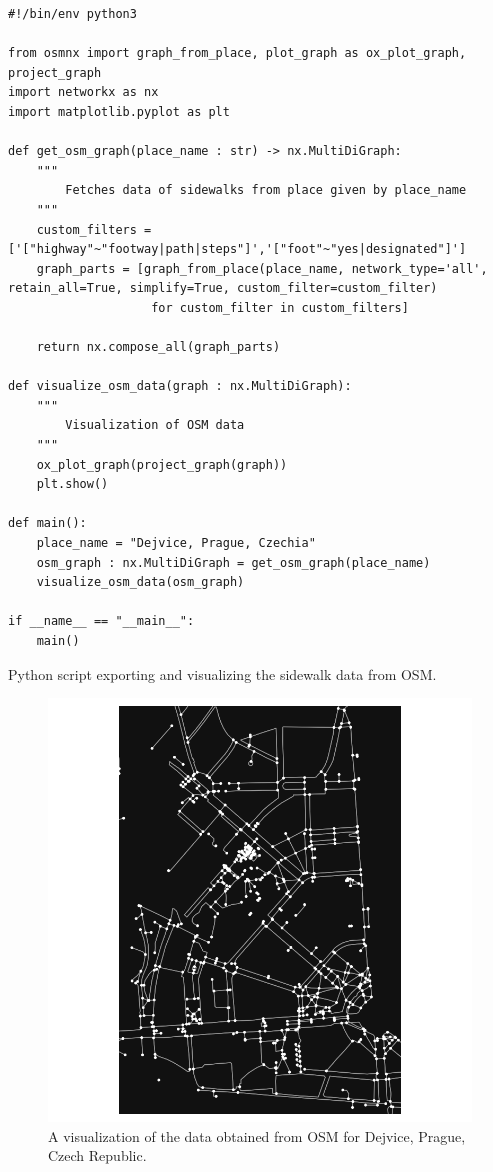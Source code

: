 \begin{listing}
    \begin{verbatim}
#!/bin/env python3

from osmnx import graph_from_place, plot_graph as ox_plot_graph, project_graph
import networkx as nx
import matplotlib.pyplot as plt

def get_osm_graph(place_name : str) -> nx.MultiDiGraph:
    """
        Fetches data of sidewalks from place given by place_name
    """
    custom_filters = ['["highway"~"footway|path|steps"]','["foot"~"yes|designated"]']
    graph_parts = [graph_from_place(place_name, network_type='all', retain_all=True, simplify=True, custom_filter=custom_filter)
                    for custom_filter in custom_filters]
    
    return nx.compose_all(graph_parts)

def visualize_osm_data(graph : nx.MultiDiGraph):
    """
        Visualization of OSM data
    """ 
    ox_plot_graph(project_graph(graph))
    plt.show()  
  
def main():
    place_name = "Dejvice, Prague, Czechia"
    osm_graph : nx.MultiDiGraph = get_osm_graph(place_name)
    visualize_osm_data(osm_graph)

if __name__ == "__main__":
    main()
    \end{verbatim}
    \caption{Python script exporting and visualizing the sidewalk data from OSM.}
    \label{cs:osm-data}
\end{listing}
\begin{figure}
    \centering
    \includegraphics[width=1.0\linewidth]{dejvice.png}
    \caption{A visualization of the data obtained from OSM for Dejvice, Prague, Czech Republic.}
    \label{fig:dejvice}
\end{figure}
